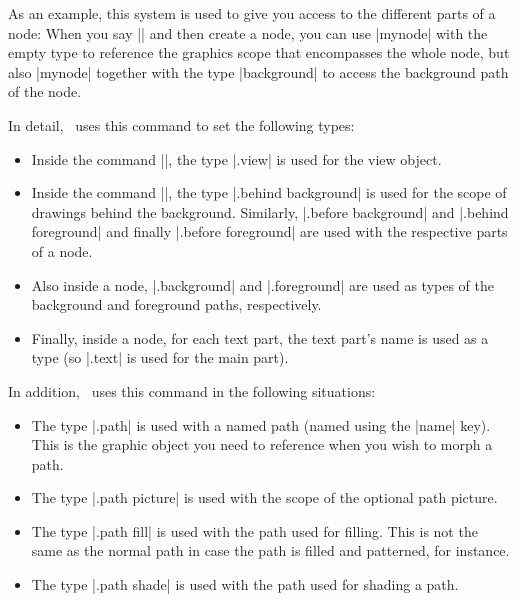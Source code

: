 \begin{command}{\pgfuseid{}}
\begin{command}{\pgfusetype{}}
        As an example, this system is used to give you access to the different
        parts of a node: When you say || and then create a
        node, you can use |mynode| with the empty type to reference the
        graphics scope that encompasses the whole node, but also |mynode|
        together with the type |background| to access the background path of
        the node.

        In detail, \pgfname\ uses this command to set the following types:
        \begin{itemize}
            \item Inside the command |\pgfviewboxscope|, the type |.view| is
                used for the view object.
            \item Inside the command |\pgfmultipartnode|, the type
                |.behind background| is used for the scope of drawings behind
                the background. Similarly, |.before background| and
                |.behind foreground| and finally |.before foreground| are used
                with the respective parts of a node.
            \item Also inside a node, |.background| and |.foreground| are used
                as types of the background and foreground paths, respectively.
            \item Finally, inside a node, for each text part, the text part's
                name is used as a type (so |.text| is used for the main part).
        \end{itemize}

        In addition, \tikzname\ uses this command in the following
        situations:
        \begin{itemize}
            \item The type |.path| is used with a named path (named using the
                |name| key). This is the graphic object you need to reference
                when you wish to morph a path.
            \item The type |.path picture| is used with the scope of the
                optional path picture.
            \item The type |.path fill| is used with the path used for filling.
                This is not the same as the normal path in case the path is
                filled and patterned, for instance.
            \item The type |.path shade| is used with the path used for shading
                a path.
        \end{itemize}
    \end{command}


\end{command}
